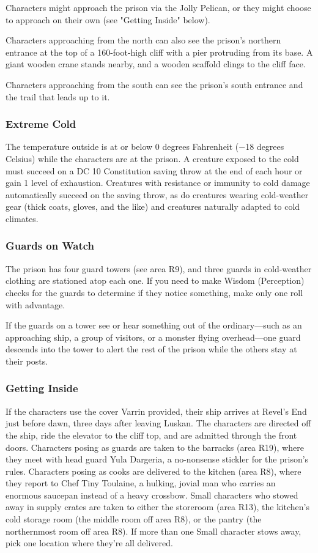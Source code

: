 \documentclass[10pt,a4paper,twoside,bg=print,twocolumn,openany,nodeprecatedcode]{dndbook}
\begin{document}
Characters might approach the prison via the Jolly Pelican, or they might choose to approach on their own (see "Getting Inside" below).

Characters approaching from the north can also see the prison's northern entrance at the top of a 160-foot-high cliff with a pier protruding from its base. A giant wooden crane stands nearby, and a wooden scaffold clings to the cliff face.

Characters approaching from the south can see the prison's south entrance and the trail that leads up to it.

\subsubsection{Extreme Cold}
The temperature outside is at or below 0 degrees Fahrenheit (−18 degrees Celsius) while the characters are at the prison. A creature exposed to the cold must succeed on a DC 10 Constitution saving throw at the end of each hour or gain 1 level of exhaustion. Creatures with resistance or immunity to cold damage automatically succeed on the saving throw, as do creatures wearing cold-weather gear (thick coats, gloves, and the like) and creatures naturally adapted to cold climates.

\subsubsection{Guards on Watch}
The prison has four guard towers (see area R9), and three guards in cold-weather clothing are stationed atop each one. If you need to make Wisdom (Perception) checks for the guards to determine if they notice something, make only one roll with advantage.

If the guards on a tower see or hear something out of the ordinary—such as an approaching ship, a group of visitors, or a monster flying overhead—one guard descends into the tower to alert the rest of the prison while the others stay at their posts.

\subsubsection{Getting Inside}
If the characters use the cover Varrin provided, their ship arrives at Revel's End just before dawn, three days after leaving Luskan. The characters are directed off the ship, ride the elevator to the cliff top, and are admitted through the front doors. Characters posing as guards are taken to the barracks (area R19), where they meet with head guard Yula Dargeria, a no-nonsense stickler for the prison's rules. Characters posing as cooks are delivered to the kitchen (area R8), where they report to Chef Tiny Toulaine, a hulking, jovial man who carries an enormous saucepan instead of a heavy crossbow. Small characters who stowed away in supply crates are taken to either the storeroom (area R13), the kitchen's cold storage room (the middle room off area R8), or the pantry (the northernmost room off area R8). If more than one Small character stows away, pick one location where they're all delivered.
\end{document}
